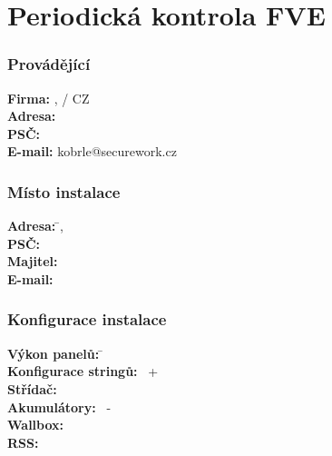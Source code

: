 \documentclass{book}
\begin{document}
 
	\chapter*{Periodická kontrola FVE}
	

	\subsection*{Provádějící}		
	\begin{tabbing}
	\hspace{2em} \= \textbf{Firma:}\hspace{6em}  \= \textbf{\zhotovitel}, \zhotovitelIC / CZ\zhotovitelIC \\[0.3cm]
	\> \textbf{Adresa:} \>  \zhotovitelUlice\\[0.3cm]
	\> \textbf{PSČ:} \>  \zhotovitelPSC\\[0.3cm]
	\> \textbf{E-mail:} \>   kobrle@securework.cz\\
	\end{tabbing}
	

	\subsection*{Místo instalace}	
	
	\begin{tabbing}
	\hspace{2em} \= \textbf{Adresa:} \hspace{10em}  \= \objednatelInstalaceUlice , \objednatelInstalaceMesto \\[0.3cm]
	\> \textbf{PSČ:} \>  \objednatelInstalacePSC \\[0.3cm]
	\> \textbf{Majitel:} \>   \objednatel \\[0.3cm]
	\> \textbf{E-mail:} \>   \objednatelEmail \\[0.3cm]
	\end{tabbing}
	
	\subsection*{Konfigurace instalace}	
	
	\begin{tabbing}
	\hspace{2em} \= \textbf{Výkon panelů:} \hspace{6em}  \= \vykonFVE \\[0.3cm]
	\> \textbf{Konfigurace stringů:} \>  \pocetPaneluPoleAA \, + \pocetPaneluPoleB \\[0.3cm]
	\> \textbf{Střídač:} \>  \stridac \\[0.3cm]
	\> \textbf{Akumulátory:} \>   \baterie \, - \kapacitaBaterii \\[0.3cm]
	\> \textbf{Wallbox:} \>   \wallbox \\[0.3cm]
	\> \textbf{RSS:} \>   \rss \\[0.3cm]
	\end{tabbing}
	
\end{document}
